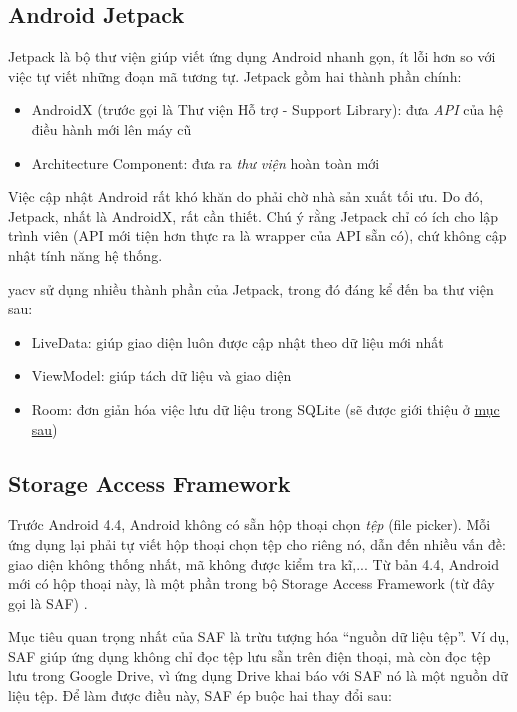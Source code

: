 \documentclass[../../thesis]{subfiles}
\begin{document}
\subsection{Android Jetpack}\label{sec:jetpack}

Jetpack là bộ thư viện giúp viết ứng dụng Android nhanh gọn, ít lỗi hơn so với
việc tự viết những đoạn mã tương tự. Jetpack gồm hai thành phần chính:

\begin{itemize}
    \item
        AndroidX (trước gọi là Thư viện Hỗ trợ - Support Library): đưa
        \emph{API} của hệ điều hành mới lên máy cũ
    \item
        Architecture Component: đưa ra \emph{thư viện} hoàn toàn mới
\end{itemize}

Việc cập nhật Android rất khó khăn do phải chờ nhà sản xuất tối ưu. Do đó,
Jetpack, nhất là AndroidX, rất cần thiết. Chú ý rằng Jetpack chỉ có ích cho lập
trình viên (API mới tiện hơn thực ra là wrapper của API sẵn có), chứ không cập
nhật tính năng hệ thống.

yacv sử dụng nhiều thành phần của Jetpack, trong đó đáng kể đến ba thư viện sau:

\begin{itemize}
    \item
        LiveData: giúp giao diện luôn được cập nhật theo dữ liệu mới nhất
    \item
        ViewModel: giúp tách dữ liệu và giao diện
    \item
        Room: đơn giản hóa việc lưu dữ liệu trong SQLite (sẽ được giới thiệu ở
        \hyperref[sec:room]{mục sau})
\end{itemize}

\subsection{Storage Access Framework}\label{sec:saf}

Trước Android 4.4, Android không có sẵn hộp thoại chọn \emph{tệp} (file picker).
Mỗi ứng dụng lại phải tự viết hộp thoại chọn tệp cho riêng nó, dẫn đến nhiều vấn
đề: giao diện không thống nhất, mã không được kiểm tra kĩ,... Từ bản 4.4,
Android mới có hộp thoại này, là một phần trong bộ Storage Access Framework (từ
đây gọi là SAF) \cite{GOOGL_SAF}.

Mục tiêu quan trọng nhất của SAF là trừu tượng hóa ``nguồn dữ liệu tệp''. Ví dụ,
SAF giúp ứng dụng không chỉ đọc tệp lưu sẵn trên điện thoại, mà còn đọc tệp lưu
trong Google Drive, vì ứng dụng Drive khai báo với SAF nó là một nguồn dữ liệu
tệp. Để làm được điều này, SAF ép buộc hai thay đổi sau:
\end{document}
